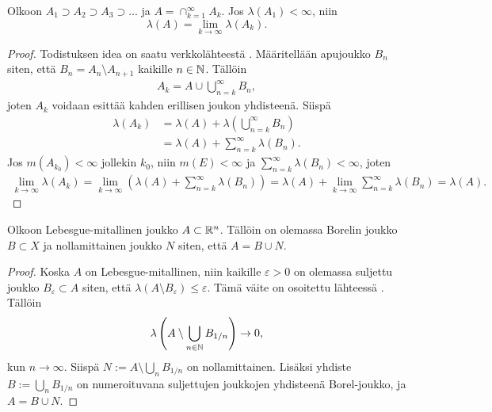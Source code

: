 \documentclass[12pt,oneside,a4paper]{amsbook} %
\begin{document}
\begin{lemma}\label{le:nestedIntersection}
    Olkoon $A_1 \supset A_2 \supset A_3 \supset ...$ ja $A = \cap_{k=1}^\infty A_k$. Jos $\lambda(A_1) < \infty$, niin 
    \begin{equation*}
        \lambda(A) = \lim_{k\to \infty}\lambda(A_k).
    \end{equation*}
\end{lemma}
\begin{proof} Todistuksen idea on saatu verkkolähteestä \cite{brozius}.
    Määritellään apujoukko $B_n$ siten, että $B_n = A_n \setminus A_{n+1}$ kaikille $n \in \mathbb{N}$. Tällöin
    \begin{align*}
        A_k = A \cup \bigcup_{n = k}^\infty B_n,
    \end{align*}
    joten $A_k$ voidaan esittää kahden erillisen joukon yhdisteenä. Siispä
    \begin{align*}
        \lambda(A_k) &= \lambda(A) + \lambda\left(\bigcup_{n = k}^\infty B_n\right) \\
        &= \lambda(A) + \sum_{n = k}^\infty\lambda(B_n).
    \end{align*}
    Jos $m(A_{k_0}) < \infty$ jollekin $k_0$, niin $m(E) < \infty$ ja $\sum_{n = k}^\infty\lambda(B_n) < \infty$, joten 
    \begin{align*}
        \lim_{k\to\infty}\lambda(A_k) = \lim_{k\to\infty}\left(\lambda(A) + \sum_{n = k}^\infty\lambda(B_n)\right) = \lambda(A) + \lim_{k\to\infty}\sum_{n=k}^\infty \lambda(B_n) = \lambda(A).
    \end{align*}
\end{proof}

\begin{lemma}\label{le:lebesgueIsBorelAndNull}
    Olkoon Lebesgue-mitallinen joukko $A \subset \mathbb{R}^n$. Tällöin on olemassa Borelin joukko $B \subset X$ ja nollamittainen joukko $N$ siten, että $A = B \cup N$.
\end{lemma}
\begin{proof}
    Koska $A$ on Lebesgue-mitallinen, niin kaikille $\varepsilon > 0$ on olemassa suljettu joukko $B_\varepsilon \subset A$ siten, että $\lambda(A\setminus B_\varepsilon) \le \varepsilon$. Tämä väite on osoitettu lähteessä \cite[s. 43]{lehrbäck}. 
    Tällöin
    \begin{align*}
        \lambda\left(A \setminus \bigcup_{n \in \mathbb{N}} B_{1/n}\right) \to 0,
    \end{align*}
    kun $n \to \infty$.
    Siispä $N := A \setminus \bigcup_n B_{1/n}$ on nollamittainen. Lisäksi yhdiste $B:= \bigcup_{n}B_{1/n}$ on numeroituvana suljettujen joukkojen yhdisteenä Borel-joukko, ja $A = B \cup N$.
\end{proof}
\end{document}
